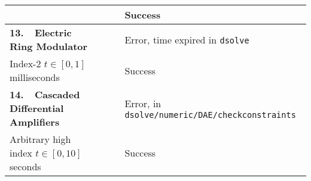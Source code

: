 {\begin{longtable}{lccl}
    & \Indigo{} & \mycheckmark{}\phantom{\mywarnmark{}} & Success \\ \midrule
  \multirow{1}{*}{\textbf{13.~~Electric Ring Modulator~\cite{lioen1998test, mazzia2008test}}}
    & \Maple{}  & \mycrossmark{}\phantom{\mywarnmark{}} & Error, time expired in \texttt{dsolve} \\ \cmidrule{2-4}
    Index-2 \quad $t \in [0, 1]$ milliseconds & \Indigo{} & \mycheckmark{}\phantom{\mywarnmark{}} & Success \\ \midrule
  \multirow{1}{*}{\textbf{14.~~Cascaded Differential Amplifiers~\cite{brenan1995numerical}}}
    & \Maple{}  & \mycrossmark{}\phantom{\mywarnmark{}} & Error, in \texttt{dsolve/numeric/DAE/checkconstraints} \\ \cmidrule{2-4}
    Arbitrary high index \quad $t \in [0, 10]$ seconds & \Indigo{} & \mycheckmark{}\phantom{\mywarnmark{}} & Success \\
  \bottomrule
\end{longtable}}